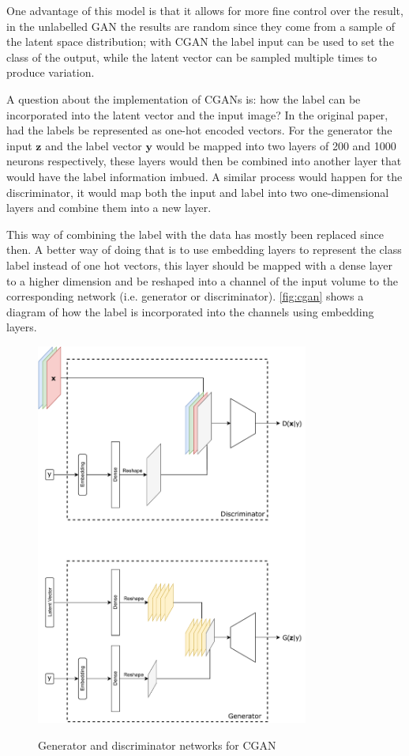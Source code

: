 One advantage of this model is that it allows for more fine control over the result, in the unlabelled \gls{GAN} the results are random since they come from a sample of the latent space distribution; with \gls{CGAN} the label input can be used to set the class of the output, while the latent vector can be sampled multiple times to produce variation.

A question about the implementation of \acp{CGAN} is: how the label can be incorporated into the latent vector and the input image? In the original paper, \textcite{conditionalGAN2014} had the labels be represented as one-hot encoded vectors. For the generator the input $\bm{z}$ and the label vector $\bm{y}$ would be mapped into two layers of 200 and 1000 neurons respectively, these layers would then be combined into another layer that would have the label information imbued. A similar process would happen for the discriminator, it would map both the input and label into two one-dimensional layers and combine them into a new layer.

This way of combining the label with the data has mostly been replaced since then. A better way of doing that is to use embedding layers to represent the class label instead of one hot vectors, this layer should be mapped with a dense layer to a higher dimension and be reshaped into a channel of the input volume to the corresponding network (i.e. generator or discriminator). \autoref{fig:cgan} shows a diagram of how the label is incorporated into the channels using embedding layers. 
\begin{figure}
    \centering
    \caption{Generator and discriminator networks for \gls{CGAN}}
    \includegraphics[width=0.8\textwidth]{chapters/GANs/figures/cgan.pdf}
    \label{fig:cgan}
\end{figure}

